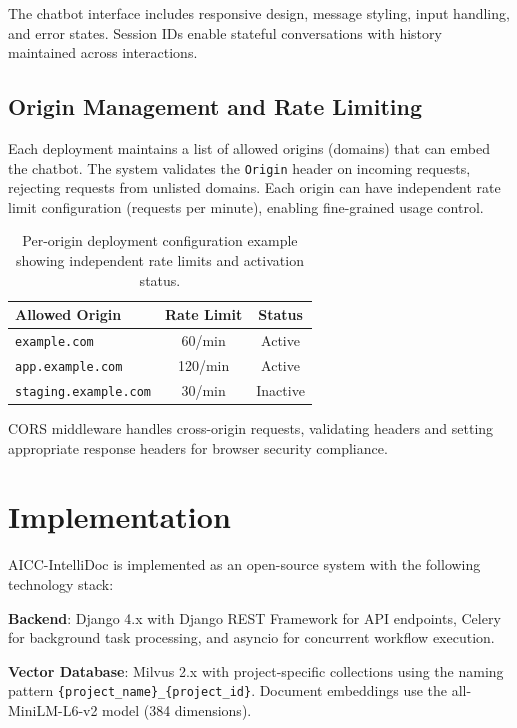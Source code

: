 \documentclass[11pt]{article}
\begin{document}
The chatbot interface includes responsive design, message styling, input handling, and error states. Session IDs enable stateful conversations with history maintained across interactions.

\subsection{Origin Management and Rate Limiting}

Each deployment maintains a list of allowed origins (domains) that can embed the chatbot. The system validates the \texttt{Origin} header on incoming requests, rejecting requests from unlisted domains. Each origin can have independent rate limit configuration (requests per minute), enabling fine-grained usage control.

\begin{table}[t]
\centering
\small
\begin{tabular}{lcc}
\toprule
\textbf{Allowed Origin} & \textbf{Rate Limit} & \textbf{Status} \\
\midrule
\texttt{example.com} & 60/min & Active \\
\texttt{app.example.com} & 120/min & Active \\
\texttt{staging.example.com} & 30/min & Inactive \\
\bottomrule
\end{tabular}
\caption{Per-origin deployment configuration example showing independent rate limits and activation status.}
\label{tab:deployment-origins}
\end{table}

CORS middleware handles cross-origin requests, validating headers and setting appropriate response headers for browser security compliance.


\section{Implementation}
\label{sec:implementation}

AICC-IntelliDoc is implemented as an open-source system with the following technology stack:

\textbf{Backend}: Django 4.x with Django REST Framework for API endpoints, Celery for background task processing, and asyncio for concurrent workflow execution.

\textbf{Vector Database}: Milvus 2.x with project-specific collections using the naming pattern \texttt{\{project\_name\}\_\{project\_id\}}. Document embeddings use the all-MiniLM-L6-v2 model (384 dimensions).
\end{document}
